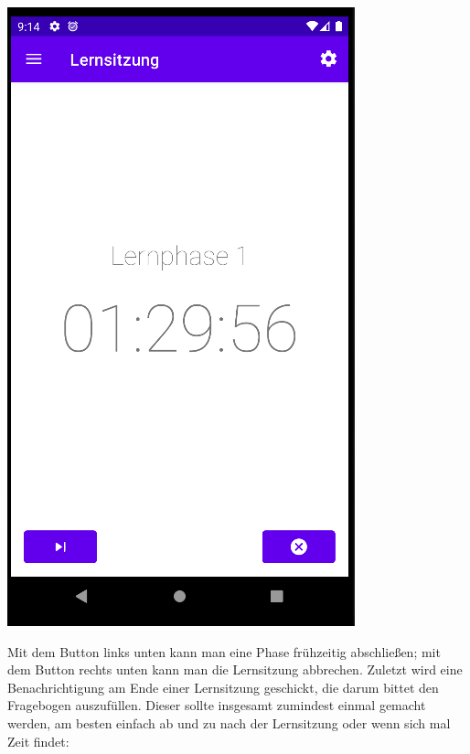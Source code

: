 \documentclass[ngerman]{tutorial}
\begin{document}
\begin{center}
    \includegraphics[scale=0.5]{learn_screen.png}
\end{center}
Mit dem Button links unten kann man eine Phase frühzeitig abschließen; mit dem Button rechts unten kann man die Lernsitzung abbrechen.
\newpage
\noindent Zuletzt wird eine Benachrichtigung am Ende einer Lernsitzung geschickt, die darum bittet den Fragebogen auszufüllen. Dieser sollte insgesamt zumindest einmal gemacht werden, am besten einfach ab und zu nach der Lernsitzung oder wenn sich mal Zeit findet:
\end{document}
